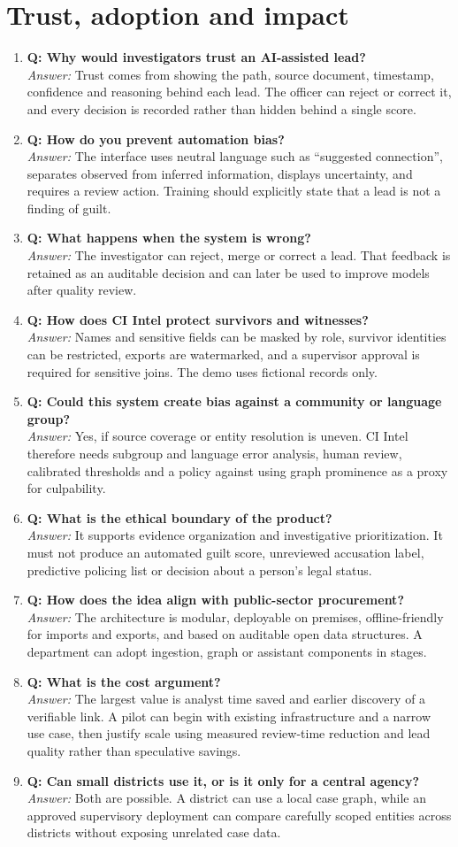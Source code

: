 \documentclass[10pt,a4paper]{article}
\newcommand{\qa}[2]{\item \textbf{\color{navy}Q: #1}\\[-1pt]{\color{coral}\textit{Answer:}} #2}
\begin{document}
\section{Trust, adoption and impact}
\begin{enumerate}[resume]
\qa{Why would investigators trust an AI-assisted lead?}{Trust comes from showing the path, source document, timestamp, confidence and reasoning behind each lead. The officer can reject or correct it, and every decision is recorded rather than hidden behind a single score.}
\qa{How do you prevent automation bias?}{The interface uses neutral language such as ``suggested connection'', separates observed from inferred information, displays uncertainty, and requires a review action. Training should explicitly state that a lead is not a finding of guilt.}
\qa{What happens when the system is wrong?}{The investigator can reject, merge or correct a lead. That feedback is retained as an auditable decision and can later be used to improve models after quality review.}
\qa{How does CI Intel protect survivors and witnesses?}{Names and sensitive fields can be masked by role, survivor identities can be restricted, exports are watermarked, and a supervisor approval is required for sensitive joins. The demo uses fictional records only.}
\qa{Could this system create bias against a community or language group?}{Yes, if source coverage or entity resolution is uneven. CI Intel therefore needs subgroup and language error analysis, human review, calibrated thresholds and a policy against using graph prominence as a proxy for culpability.}
\qa{What is the ethical boundary of the product?}{It supports evidence organization and investigative prioritization. It must not produce an automated guilt score, unreviewed accusation label, predictive policing list or decision about a person's legal status.}
\qa{How does the idea align with public-sector procurement?}{The architecture is modular, deployable on premises, offline-friendly for imports and exports, and based on auditable open data structures. A department can adopt ingestion, graph or assistant components in stages.}
\qa{What is the cost argument?}{The largest value is analyst time saved and earlier discovery of a verifiable link. A pilot can begin with existing infrastructure and a narrow use case, then justify scale using measured review-time reduction and lead quality rather than speculative savings.}
\qa{Can small districts use it, or is it only for a central agency?}{Both are possible. A district can use a local case graph, while an approved supervisory deployment can compare carefully scoped entities across districts without exposing unrelated case data.}

\end{enumerate}
\end{document}
